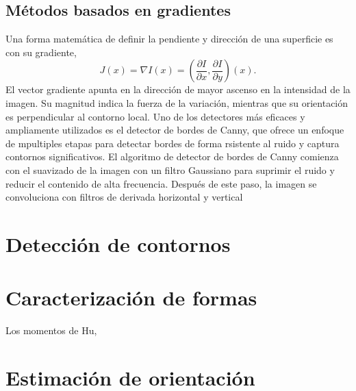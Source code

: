 \subsection{Métodos basados en gradientes\\}
Una forma matemática de definir la pendiente y dirección de una superficie es con su gradiente,
\begin{equation}
\label{eq:gradient}
J(x)=\nabla I(x)= (\frac{\partial I}{\partial x}, \frac{\partial I}{\partial y}) (x). 
\end{equation}
El vector gradiente apunta en la dirección de mayor ascenso en la intensidad de la imagen. Su magnitud indica la fuerza de la variación, mientras que su orientación es perpendicular al contorno local.
Uno de los detectores más eficaces y ampliamente utilizados es el detector de bordes de Canny, que ofrece un enfoque de mpultiples etapas para detectar bordes de forma rsistente al ruido y captura contornos significativos.
El algoritmo de detector de bordes de Canny comienza con el suavizado de la imagen con un filtro Gaussiano para suprimir el ruido y reducir el contenido de alta frecuencia. Después de este paso, la imagen se convoluciona con filtros de derivada horizontal y vertical

\section{Detección de contornos}
\section{Caracterización de formas}
Los momentos de Hu, 

\section{Estimación de orientación}